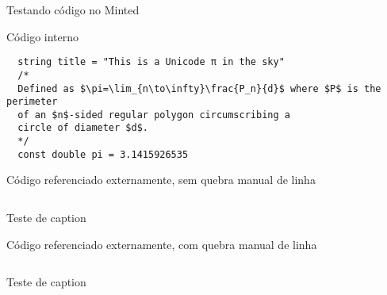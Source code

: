 \documentclass[a4paper,12pt,brazil,doubleside]{book}
\begin{document}
\lstset{ %
 breakatwhitespace=false,
 breaklines=true
}

Testando código no Minted

Código interno
\begin{listing}
\begin{verbatim}
  string title = "This is a Unicode π in the sky"
  /*
  Defined as $\pi=\lim_{n\to\infty}\frac{P_n}{d}$ where $P$ is the perimeter
  of an $n$-sided regular polygon circumscribing a
  circle of diameter $d$.
  */
  const double pi = 3.1415926535
\end{verbatim}
\end{listing}

Código referenciado externamente, sem quebra manual de linha
\begin{listing}
\inputminted[linenos=true,bgcolor=bg]{java}{src/teste2.java}
\label{AndroidManifest.sdk}
\caption{Teste de caption}
\end{listing}

Código referenciado externamente, com quebra manual de linha
\begin{listing}
\inputminted[linenos=true,bgcolor=bg]{java}{src/teste.java}
\label{AndroidManifest.sdk}
\caption{Teste de caption}
\end{listing}
\end{document}
